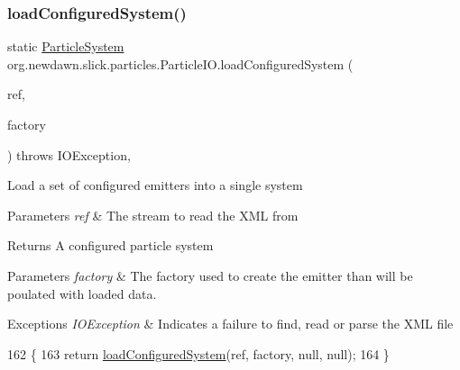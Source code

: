 \subsubsection{\texorpdfstring{load\+Configured\+System()}{loadConfiguredSystem()}\hspace{0.1cm}{\footnotesize\ttfamily [8/9]}}
{\footnotesize\ttfamily static \mbox{\hyperlink{classorg_1_1newdawn_1_1slick_1_1particles_1_1_particle_system}{Particle\+System}} org.\+newdawn.\+slick.\+particles.\+Particle\+I\+O.\+load\+Configured\+System (\begin{DoxyParamCaption}\item[{Input\+Stream}]{ref,  }\item[{\mbox{\hyperlink{interfaceorg_1_1newdawn_1_1slick_1_1particles_1_1_configurable_emitter_factory}{Configurable\+Emitter\+Factory}}}]{factory }\end{DoxyParamCaption}) throws I\+O\+Exception\hspace{0.3cm}{\ttfamily [inline]}, {\ttfamily [static]}}

Load a set of configured emitters into a single system


\begin{DoxyParams}{Parameters}
{\em ref} & The stream to read the X\+ML from \\
\hline
\end{DoxyParams}
\begin{DoxyReturn}{Returns}
A configured particle system 
\end{DoxyReturn}

\begin{DoxyParams}{Parameters}
{\em factory} & The factory used to create the emitter than will be poulated with loaded data. \\
\hline
\end{DoxyParams}

\begin{DoxyExceptions}{Exceptions}
{\em I\+O\+Exception} & Indicates a failure to find, read or parse the X\+ML file \\
\hline
\end{DoxyExceptions}

\begin{DoxyCode}
162                                                                    \{
163             \textcolor{keywordflow}{return} \mbox{\hyperlink{classorg_1_1newdawn_1_1slick_1_1particles_1_1_particle_i_o_a1da2bcc8784c9cf967326954bc3c9d33}{loadConfiguredSystem}}(ref, factory, null, null);
164          \}
\end{DoxyCode}
\mbox{\label{classorg_1_1newdawn_1_1slick_1_1particles_1_1_particle_i_o_a4731a702feaf10afe51285980453aa2a}} 
